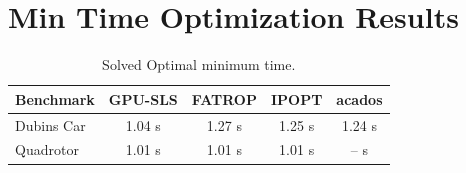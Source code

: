 \documentclass{article}
\begin{document}
\section{Min Time Optimization Results}
\begin{table}[H]
\centering
\caption{Solved Optimal minimum time.}
\label{tab:min_time_benchmark}
\begin{tabular}{lcccc}
\toprule
\textbf{Benchmark} & \textbf{GPU-SLS} & \textbf{FATROP} & \textbf{IPOPT} & \textbf{acados} \\
\midrule
Dubins Car & 1.04 s & 1.27 s & 1.25 s & 1.24 s \\
Quadrotor  & 1.01 s & 1.01 s & 1.01 s&  -- s\\
\bottomrule
\end{tabular}
\end{table}
\end{document}
